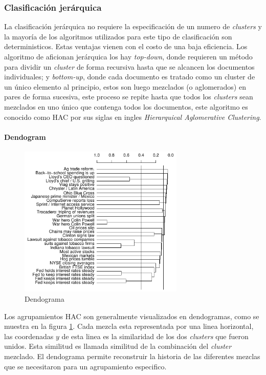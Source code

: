   \subsubsection{Clasificación jerárquica}
    La clasificación jerárquica no requiere la especificación de un numero de \textit{clusters} y la mayoría de los algoritmos utilizados para este tipo de clasificación son deterministicos. Estas ventajas vienen con el costo de una baja eficiencia.
    Los algoritmo de aficionan jerárquica los hay \textit{top-down}, donde requieren un método para dividir un \textit{cluster} de forma recursiva hasta que se alcancen los documentos individuales; y \textit{bottom-up}, donde cada documento es tratado como un cluster de un único elemento al principio, estos son luego mezclados (o aglomerados) en pares de forma sucesiva, este proceso se repite hasta que todos los \textit{clusters} sean mezclados en uno único que contenga todos los documentos, este algoritmo es conocido como HAC por sus siglas en ingles \textit{Hierarquical Aglomerative Clustering}.\cite{informationretrieval}   


    \paragraph{Dendogram}

      \begin{figure}[!htbp]
        \centering
        \includegraphics[width=0.7\textwidth]{Figuras/dendograma.png}
        \caption{Dendograma}
        \label{fig:dendograma}
      \end{figure}

  

      Los agrupamientos HAC son generalmente visualizados en dendogramas, como se muestra en la figura \ref{fig:dendograma}. Cada mezcla esta representada por una linea horizontal, las coordenadas $y$ de esta linea es la similaridad de los dos \textit{clusters} que fueron unidos. Esta similitud es llamada similitud de la combinación del \textit{cluster} mezclado. El dendograma permite reconstruir la historia de las diferentes mezclas que se necesitaron para un agrupamiento especifico.\cite{informationretrieval}
    
